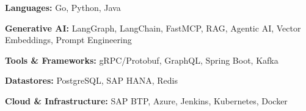 \begin{cvskills}

  \cvskill
    {\bf Languages:}
    {Go, Python, Java}

  \cvskill
    {\bf Generative AI:}
    {LangGraph, LangChain, FastMCP, RAG, Agentic AI, Vector Embeddings, Prompt Engineering}

  \cvskill
    {\bf Tools \& Frameworks:}
    {gRPC/Protobuf, GraphQL, Spring Boot, Kafka}

  \cvskill
    {\bf Datastores:}
    {PostgreSQL, SAP HANA, Redis}

  \cvskill
    {\bf Cloud \& Infrastructure:}
    {SAP BTP, Azure, Jenkins, Kubernetes, Docker}

\end{cvskills}
